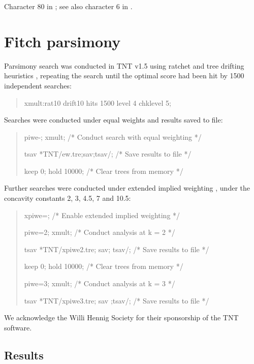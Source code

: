 \documentclass[openany]{book}
\theoremstyle{definition}
\theoremstyle{definition}
\theoremstyle{definition}
\theoremstyle{remark}
\begin{document}
Character 80 in \citet{Glenner2004}; see also character 6 in
\citet{Vinther2008}.

\hypertarget{fitch}{\chapter{Fitch parsimony}\label{fitch}}

Parsimony search was conducted in TNT v1.5 \citep{Goloboff2016} using
ratchet and tree drifting heuristics \citep{Goloboff1999, Nixon1999},
repeating the search until the optimal score had been hit by 1500
independent searches:

\begin{quote}
xmult:rat10 drift10 hits 1500 level 4 chklevel 5;
\end{quote}

Searches were conducted under equal weights and results saved to file:

\begin{quote}
piwe-; xmult; {/* Conduct search with equal weighting */}

tsav *TNT/ew.tre;sav;tsav/; {/* Save results to file */}

keep 0; hold 10000; {/* Clear trees from memory */}
\end{quote}

Further searches were conducted under extended implied weighting
\citep{Goloboff1997, Goloboff2014}, under the concavity constants 2, 3,
4.5, 7 and 10.5:

\begin{quote}
xpiwe=; {/* Enable extended implied weighting */}

piwe=2; xmult; {/* Conduct analysis at k = 2 */}

tsav *TNT/xpiwe2.tre; sav; tsav/; {/* Save results to file */}

keep 0; hold 10000; {/* Clear trees from memory */}

piwe=3; xmult; {/* Conduct analysis at k = 3 */}

tsav *TNT/xpiwe3.tre; sav ;tsav/; {/* Save results to file */}
\end{quote}

We acknowledge the Willi Hennig Society for their sponsorship of the TNT
software.

\section{Results}\label{results-1}
\end{document}
